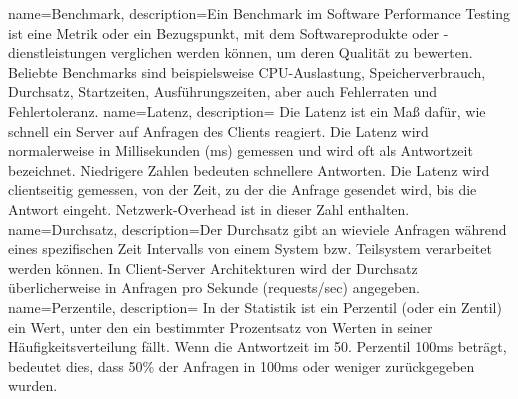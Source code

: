 {
  name=Benchmark,
  description={Ein Benchmark im Software Performance Testing ist
      eine Metrik oder ein Bezugspunkt, mit dem Softwareprodukte oder -dienstleistungen verglichen werden können, um deren Qualität zu bewerten.
      Beliebte Benchmarks sind beispielsweise CPU-Auslastung, Speicherverbrauch, Durchsatz, Startzeiten, Ausführungszeiten,
      aber auch Fehlerraten und Fehlertoleranz.
    }
}
{
  name=Latenz,
  description={
      Die Latenz ist ein Maß dafür, wie schnell ein Server auf Anfragen des Clients reagiert.
      Die Latenz wird normalerweise in Millisekunden (ms) gemessen und wird oft als Antwortzeit bezeichnet.
      Niedrigere Zahlen bedeuten schnellere Antworten. Die Latenz wird clientseitig gemessen, von der
      Zeit, zu der die Anfrage gesendet wird, bis die Antwort eingeht. Netzwerk-Overhead ist in dieser Zahl enthalten.}
}
{
  name=Durchsatz,
  description={Der Durchsatz gibt an wieviele Anfragen während eines spezifischen Zeit Intervalls von einem System bzw. Teilsystem
      verarbeitet werden können. In Client-Server Architekturen wird der Durchsatz überlicherweise
      in Anfragen pro Sekunde (requests/sec) angegeben.}
}
{
  name=Perzentile,
  description=
    {In der Statistik ist ein Perzentil (oder ein Zentil) ein Wert, unter den ein bestimmter Prozentsatz von Werten in seiner Häufigkeitsverteilung fällt.
      Wenn die Antwortzeit im 50. Perzentil 100ms beträgt, bedeutet dies, dass 50\% der Anfragen in 100ms oder weniger zurückgegeben wurden.
    }
}
